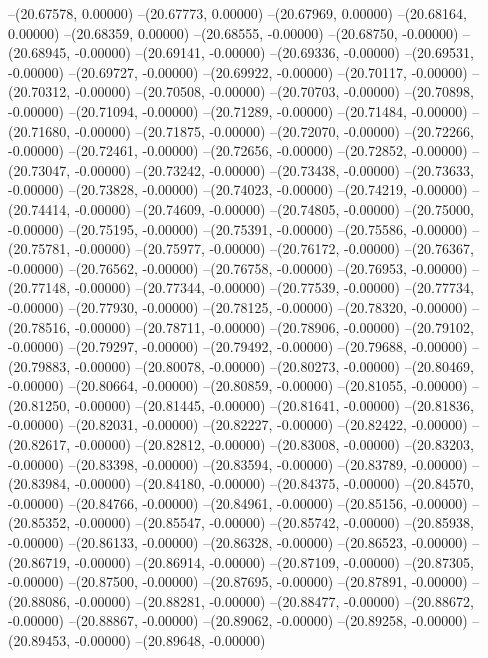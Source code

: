 --(20.67578, 0.00000)
--(20.67773, 0.00000)
--(20.67969, 0.00000)
--(20.68164, 0.00000)
--(20.68359, 0.00000)
--(20.68555, -0.00000)
--(20.68750, -0.00000)
--(20.68945, -0.00000)
--(20.69141, -0.00000)
--(20.69336, -0.00000)
--(20.69531, -0.00000)
--(20.69727, -0.00000)
--(20.69922, -0.00000)
--(20.70117, -0.00000)
--(20.70312, -0.00000)
--(20.70508, -0.00000)
--(20.70703, -0.00000)
--(20.70898, -0.00000)
--(20.71094, -0.00000)
--(20.71289, -0.00000)
--(20.71484, -0.00000)
--(20.71680, -0.00000)
--(20.71875, -0.00000)
--(20.72070, -0.00000)
--(20.72266, -0.00000)
--(20.72461, -0.00000)
--(20.72656, -0.00000)
--(20.72852, -0.00000)
--(20.73047, -0.00000)
--(20.73242, -0.00000)
--(20.73438, -0.00000)
--(20.73633, -0.00000)
--(20.73828, -0.00000)
--(20.74023, -0.00000)
--(20.74219, -0.00000)
--(20.74414, -0.00000)
--(20.74609, -0.00000)
--(20.74805, -0.00000)
--(20.75000, -0.00000)
--(20.75195, -0.00000)
--(20.75391, -0.00000)
--(20.75586, -0.00000)
--(20.75781, -0.00000)
--(20.75977, -0.00000)
--(20.76172, -0.00000)
--(20.76367, -0.00000)
--(20.76562, -0.00000)
--(20.76758, -0.00000)
--(20.76953, -0.00000)
--(20.77148, -0.00000)
--(20.77344, -0.00000)
--(20.77539, -0.00000)
--(20.77734, -0.00000)
--(20.77930, -0.00000)
--(20.78125, -0.00000)
--(20.78320, -0.00000)
--(20.78516, -0.00000)
--(20.78711, -0.00000)
--(20.78906, -0.00000)
--(20.79102, -0.00000)
--(20.79297, -0.00000)
--(20.79492, -0.00000)
--(20.79688, -0.00000)
--(20.79883, -0.00000)
--(20.80078, -0.00000)
--(20.80273, -0.00000)
--(20.80469, -0.00000)
--(20.80664, -0.00000)
--(20.80859, -0.00000)
--(20.81055, -0.00000)
--(20.81250, -0.00000)
--(20.81445, -0.00000)
--(20.81641, -0.00000)
--(20.81836, -0.00000)
--(20.82031, -0.00000)
--(20.82227, -0.00000)
--(20.82422, -0.00000)
--(20.82617, -0.00000)
--(20.82812, -0.00000)
--(20.83008, -0.00000)
--(20.83203, -0.00000)
--(20.83398, -0.00000)
--(20.83594, -0.00000)
--(20.83789, -0.00000)
--(20.83984, -0.00000)
--(20.84180, -0.00000)
--(20.84375, -0.00000)
--(20.84570, -0.00000)
--(20.84766, -0.00000)
--(20.84961, -0.00000)
--(20.85156, -0.00000)
--(20.85352, -0.00000)
--(20.85547, -0.00000)
--(20.85742, -0.00000)
--(20.85938, -0.00000)
--(20.86133, -0.00000)
--(20.86328, -0.00000)
--(20.86523, -0.00000)
--(20.86719, -0.00000)
--(20.86914, -0.00000)
--(20.87109, -0.00000)
--(20.87305, -0.00000)
--(20.87500, -0.00000)
--(20.87695, -0.00000)
--(20.87891, -0.00000)
--(20.88086, -0.00000)
--(20.88281, -0.00000)
--(20.88477, -0.00000)
--(20.88672, -0.00000)
--(20.88867, -0.00000)
--(20.89062, -0.00000)
--(20.89258, -0.00000)
--(20.89453, -0.00000)
--(20.89648, -0.00000)
